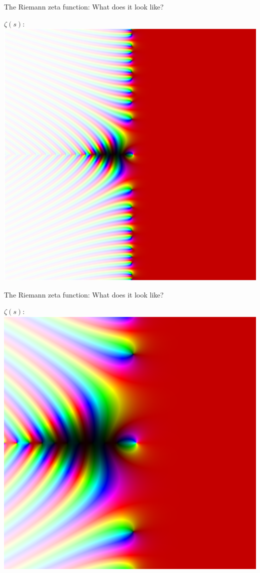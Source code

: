 \documentclass{beamer}
\begin{document}
\begin{frame}{The Riemann zeta function: What does it look like?}
\begin{center}
$\zeta(s)$:\\[0.7em]\includegraphics[height=0.75\textheight]{img/wide}
\end{center}
\end{frame}

\begin{frame}{The Riemann zeta function: What does it look like?}
\begin{center}
$\zeta(s)$:\\[0.7em]\includegraphics[height=0.75\textheight]{img/close}
\end{center}
\end{frame}
\end{document}
